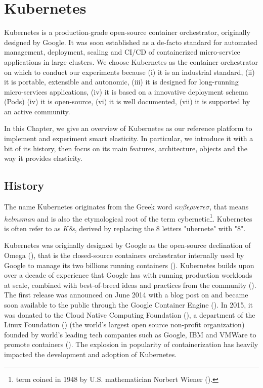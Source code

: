 \chapter{Kubernetes}
\label{chp:kubernetes}

Kubernetes is a production-grade open-source container orchestrator, originally designed by Google.
%
It was soon established as a de-facto standard for automated management, deployment, scaling and CI/CD of containerized micro-service applications in large clusters.
%
%
%
We choose Kubernetes as the container orchestrator on which to conduct our experiments because 
(i) it is an industrial standard,
(ii) it is portable, extensible and autonomic,
(iii) it is designed for long-running micro-services applications,
(iv) it is based on a innovative deployment schema (Pods)
(iv) it is open-source,
(vi) it is well documented,
(vii) it is supported by an active community.

In this Chapter, we give an overview of Kubernetes as our reference platform to implement and experiment smart elasticity.
%
In particular, we introduce it with a bit of its history, then focus on its main features, architecture, objects and the way it provides elasticity.


\section{History}
\label{sec:kuberetes-history}
The name Kubernetes originates from the Greek word $\kappa\upsilon\beta\epsilon\rho\nu\epsilon\tau\epsilon\sigma$, that means \textit{helmsman} and is also the etymological root of the term cybernetic\footnote{term coined in 1948 by U.S. mathematician Norbert Wiener (\cite{masani2012norbert}).}.
%
Kubernetes is often refer to as \textit{K8s}, derived by replacing the 8 letters "ubernete" with "8".

Kubernetes was originally designed by Google as the open-source declination of Omega (\cite{burns2016borg}), that is the closed-source containers orchestrator internally used by Google to manage its two billions running containers (\cite{schwarzkopf2013omega}).
%
Kubernetes builds upon over a decade of experience that Google has with running production workloads at scale, combined with best-of-breed ideas and practices from the community (\cite{verma2015large}).
%
The first release was announced on June 2014 with a blog post on \cite{google-announces-kubernetes} and became soon available to the public through the Google Container Engine (\cite{google-container-engine-web}).
%
In 2015, it was donated to the Cloud Native Computing Foundation (\cite{techcrunch-kubernetes-cncf}), a department of the Linux Foundation (\cite{linux-foundation-web}) (the world's largest open source non-profit organization) founded by world's leading tech companies such as Google, IBM and VMWare to promote containers (\cite{zdnet-cncf}).
%
The explosion in popularity of containerization has heavily impacted the development and adoption of Kubernetes.


